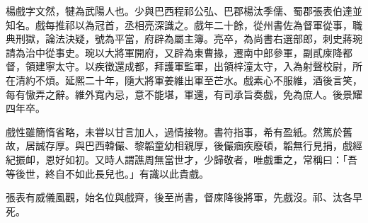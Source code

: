 \begin{pinyinscope}
 
 
 楊戲字文然，犍為武陽人也。少與巴西程祁公弘、巴郡楊汰季儒、蜀郡張表伯達並知名。戲每推祁以為冠首，丞相亮深識之。戲年二十餘，從州書佐為督軍從事，職典刑獄，論法決疑，號為平當，府辟為屬主簿。亮卒，為尚書右選部郎，刺史蔣琬請為治中從事史。琬以大將軍開府，又辟為東曹掾，遷南中郎參軍，副貳庲降都督，領建寧太守。以疾徵還成都，拜護軍監軍，出領梓潼太守，入為射聲校尉，所在清約不煩。延熈二十年，隨大將軍姜維出軍至芒水。戲素心不服維，酒後言笑，每有慠弄之辭。維外寬內忌，意不能堪，軍還，有司承旨奏戲，免為庶人。後景耀四年卒。
 
 
 
 
 戲性雖簡惰省略，未甞以甘言加人，過情接物。書符指事，希有盈紙。然篤於舊故，居誠存厚。與巴西韓儼、黎韜童幼相親厚，後儼痼疾廢頓，韜無行見捐，戲經紀振卹，恩好如初。又時人謂譙周無當世才，少歸敬者，唯戲重之，常稱曰：「吾等後世，終自不如此長兒也。」有識以此貴戲。
 
 
 
 
 張表有威儀風觀，始名位與戲齊，後至尚書，督庲降後將軍，先戲沒。祁、汰各早死。
 

\end{pinyinscope}
